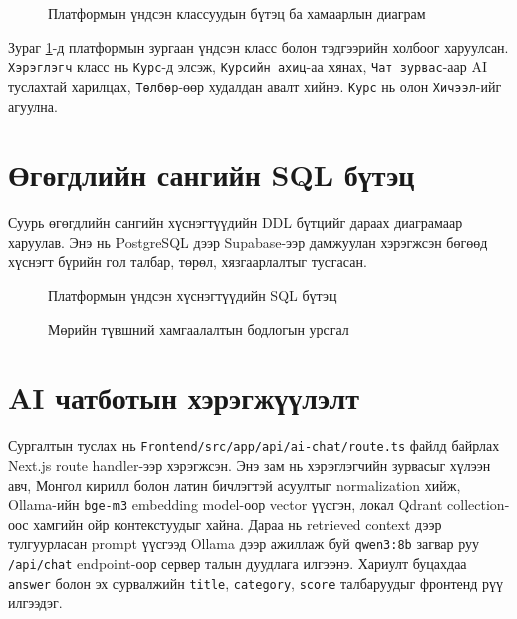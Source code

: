 \begin{figure}[H]
  \centering
  \resizebox{\textwidth}{!}{}
  \caption[Классын диаграм]{Платформын үндсэн классуудын бүтэц ба хамаарлын диаграм}
  \label{fig:ch3-class}
\end{figure}

Зураг \ref{fig:ch3-class}-д платформын зургаан үндсэн класс болон тэдгээрийн холбоог харуулсан. \texttt{Хэрэглэгч} класс нь \texttt{Курс}-д элсэж, \texttt{Курсийн ахиц}-аа хянах, \texttt{Чат зурвас}-аар AI туслахтай харилцах, \texttt{Төлбөр}-өөр худалдан авалт хийнэ. \texttt{Курс} нь олон \texttt{Хичээл}-ийг агуулна.

\section{Өгөгдлийн сангийн SQL бүтэц}
Суурь өгөгдлийн сангийн хүснэгтүүдийн DDL бүтцийг дараах диаграмаар харуулав. Энэ нь PostgreSQL дээр Supabase-ээр дамжуулан хэрэгжсэн бөгөөд хүснэгт бүрийн гол талбар, төрөл, хязгаарлалтыг тусгасан.

\begin{figure}[H]
  \centering
  \resizebox{\textwidth}{!}{}
  \caption[SQL схемийн диаграм]{Платформын үндсэн хүснэгтүүдийн SQL бүтэц}
  \label{fig:ch3-sql-schema}
\end{figure}

\begin{figure}[H]
  \centering
  \resizebox{0.85\textwidth}{!}{}
  \caption[RLS бодлогын диаграм]{Мөрийн түвшний хамгаалалтын бодлогын урсгал}
  \label{fig:ch3-rls-policy}
\end{figure}

\section{AI чатботын хэрэгжүүлэлт}
Сургалтын туслах нь \texttt{Frontend/src/app/api/ai-chat/route.ts} файлд байрлах Next.js route handler-ээр хэрэгжсэн. Энэ зам нь хэрэглэгчийн зурвасыг хүлээн авч, Монгол кирилл болон латин бичлэгтэй асуултыг normalization хийж, Ollama-ийн \texttt{bge-m3} embedding model-оор vector үүсгэн, локал Qdrant collection-оос хамгийн ойр контекстуудыг хайна. Дараа нь retrieved context дээр тулгуурласан prompt үүсгээд Ollama дээр ажиллаж буй \texttt{qwen3:8b} загвар руу \texttt{/api/chat} endpoint-оор сервер талын дуудлага илгээнэ. Хариулт буцахдаа \texttt{answer} болон эх сурвалжийн \texttt{title}, \texttt{category}, \texttt{score} талбаруудыг фронтенд рүү илгээдэг.

